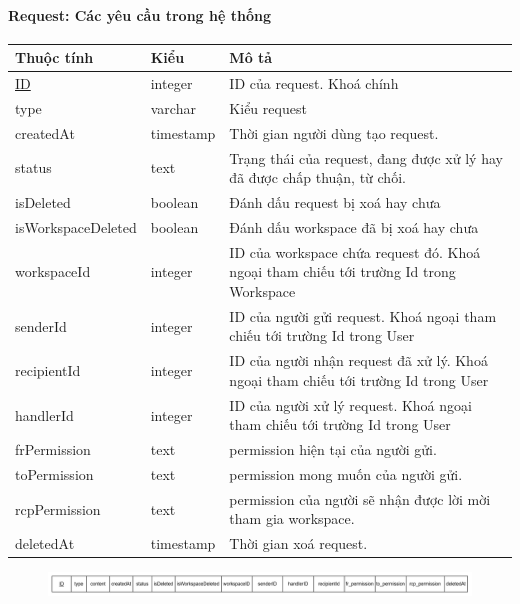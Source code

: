 \paragraph{Request: Các yêu cầu trong hệ thống}
\begin{center}
\begin{tabular}{ |p{3cm} |p{3cm} |p{9cm}|} 
 \hline
    Thuộc tính & Kiểu & Mô tả \\ [0.5ex] 
 \hline
 \underline{ID} & integer & ID của request. Khoá chính \\ 
 \hline
 type & varchar & Kiểu request \\
 \hline
 createdAt & timestamp & Thời gian người dùng tạo request.\\
 \hline
 status & text & Trạng thái của request, đang được xử lý hay đã được chấp thuận, từ chối.\\
 \hline
 isDeleted & boolean & Đánh dấu request bị xoá hay chưa \\
 \hline
 isWorkspaceDeleted & boolean & Đánh dấu workspace đã bị xoá hay chưa \\
 \hline
 workspaceId & integer & ID của workspace chứa request đó. Khoá ngoại tham chiếu tới trường Id trong Workspace \\
 \hline
  senderId & integer & ID của người gửi request. Khoá ngoại tham chiếu tới trường Id trong User \\
 \hline
  recipientId & integer & ID của người nhận request đã xử lý. Khoá ngoại tham chiếu tới trường Id trong User \\
 \hline
  handlerId & integer & ID của người xử lý request. Khoá ngoại tham chiếu tới trường Id trong User \\
 \hline
  frPermission & text & permission hiện tại của người gửi. \\
 \hline
  toPermission & text & permission mong muốn của người gửi. \\
 \hline
  rcpPermission & text & permission của người sẽ nhận được lời mời tham gia workspace. \\
 \hline
  deletedAt & timestamp & Thời gian xoá request. \\
 \hline
\end{tabular}
\end{center}
\begin{figure}[h]
        \centering
        \includegraphics[width=\textwidth]{Content/Phân tích và thiết kế hệ thống/images/ERD_mapping/request_mapping.png}
        \label{fig:enter-label}
\end{figure}

